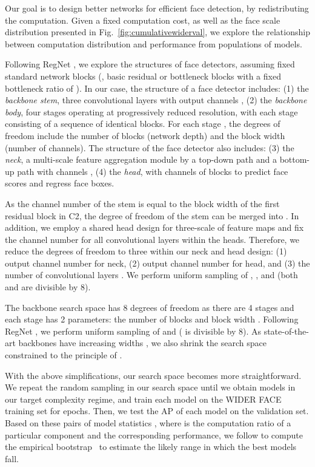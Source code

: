 \documentclass[10pt,twocolumn,letterpaper]{article}
\begin{document}
Our goal is to design better networks for efficient face detection, by redistributing the computation. Given a fixed computation cost, as well as the face scale distribution presented in Fig.~\ref{fig:cumulativewiderval}, we explore the relationship between computation distribution and performance from populations of models. 

Following RegNet \cite{radosavovic2020designing}, we explore the structures of face detectors, assuming fixed standard network blocks (\ie, basic residual or bottleneck blocks with a fixed bottleneck ratio of ). In our case, the structure of a face detector includes: (1) the \textit{backbone stem}, three  convolutional layers with  output channels \cite{he2019bag}, (2) the \textit{backbone body}, four stages operating at progressively reduced resolution, with each stage consisting of a sequence of identical blocks. For each stage , the degrees of freedom include the number of blocks  (\ie network depth) and the block width  (\ie number of channels). The structure of the face detector also includes: (3) the \textit{neck}, a multi-scale feature aggregation module by a top-down path and a bottom-up path with  channels \cite{liu2018path}, (4) the \textit{head}, with  channels of  blocks to predict face scores and regress face boxes. 

As the channel number of the stem is equal to the block width of the first residual block in C2, the degree of freedom of the stem can be merged into . In addition, we employ a shared head design for three-scale of feature maps and fix the channel number for all  convolutional layers within the heads. Therefore, we reduce the degrees of freedom to three within our neck and head design: (1) output channel number  for neck, (2) output channel number  for head, and (3) the number of  convolutional layers . We perform uniform sampling of , , and  (both  and  are divisible by 8).

The backbone search space has 8 degrees of freedom as there are 4 stages and each stage  has 2 parameters: the number of blocks  and block width . Following RegNet \cite{radosavovic2020designing}, we perform uniform sampling of  and  ( is divisible by 8). 
As state-of-the-art backbones have increasing widths \cite{radosavovic2020designing}, we also shrink the search space constrained to the principle of .

With the above simplifications, our search space becomes more straightforward. We repeat the random sampling in our search space until we obtain  models in our target complexity regime, and train each model on the WIDER FACE training set for  epochs. Then, we test the AP of each model on the validation set. 
Based on these  pairs of model statistics , where  is the computation ratio of a particular component and  the corresponding performance, we follow \cite{radosavovic2020designing} to compute the empirical bootstrap~\cite{Efron1994} to estimate the likely range in which the best models fall. 
\end{document}

